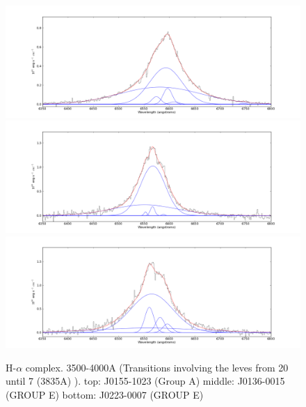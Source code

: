\documentclass[usenatbib]{mn2e}
\begin{document}
\begin{figure}
\begin{center}
\includegraphics[width=0.46\linewidth,angle=0]{Halpha_1.png}
\vspace{5mm}
\includegraphics[width=0.49\linewidth,angle=0]{Halpha_17.png}\\
\includegraphics[width=0.46\linewidth,angle=0]{Halpha_20.png}
\end{center} 
\caption{H-$\alpha$ complex. 3500-4000A (Transitions involving  the leves from 20 until 7 (3835A) ).   top: J0155-1023 (Group A) middle: J0136-0015 (GROUP E) bottom: J0223-0007 (GROUP E) \label{fig:landscape}}   
\end{figure}
\end{document}

